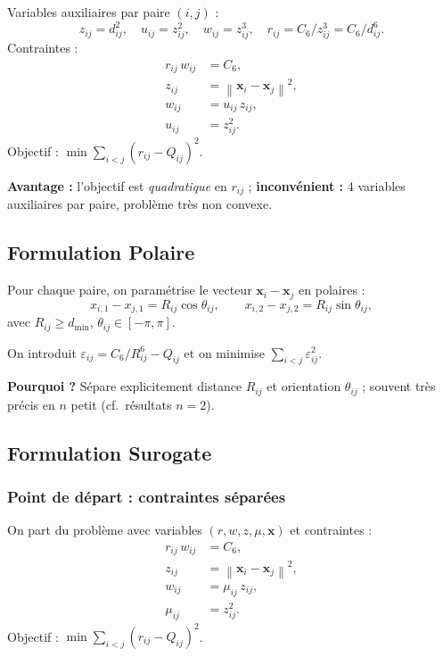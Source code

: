 \documentclass[12pt,a4paper]{article}
\newcommand{\norm}[1]{\left\|#1\right\|}
\begin{document}
Variables auxiliaires par paire $(i,j)$ :
\[
  z_{ij} = d_{ij}^2,\quad
  u_{ij} = z_{ij}^2,\quad
  w_{ij} = z_{ij}^3,\quad
  r_{ij} = C_6/z_{ij}^3 = C_6/d_{ij}^6.
\]
Contraintes :
\begin{align*}
  r_{ij}\,w_{ij} &= C_6, \\
  z_{ij} &= \norm{\mathbf{x}_i-\mathbf{x}_j}^2, \\
  w_{ij} &= u_{ij}\,z_{ij}, \\
  u_{ij} &= z_{ij}^2.
\end{align*}
Objectif : $\min \sum_{i<j}(r_{ij}-Q_{ij})^2$.

\textbf{Avantage :} l'objectif est \emph{quadratique} en $r_{ij}$ ;
\textbf{inconvénient :} 4 variables auxiliaires par paire, problème très non convexe.

\subsection{Formulation Polaire}

Pour chaque paire, on paramétrise le vecteur $\mathbf{x}_i-\mathbf{x}_j$ en polaires :
\[
  x_{i,1}-x_{j,1} = R_{ij}\cos\theta_{ij},\qquad
  x_{i,2}-x_{j,2} = R_{ij}\sin\theta_{ij},
\]
avec $R_{ij} \geq d_{\min}$, $\theta_{ij} \in [-\pi,\pi]$.

On introduit $\varepsilon_{ij} = C_6/R_{ij}^6 - Q_{ij}$ et on minimise
$\sum_{i<j}\varepsilon_{ij}^2$.

\textbf{Pourquoi ?} Sépare explicitement distance $R_{ij}$ et orientation
$\theta_{ij}$ ; souvent très précis en $n$ petit (cf.\ résultats $n=2$).

\subsection{Formulation Surogate}

\subsubsection{Point de départ : contraintes séparées}

On part du problème avec variables $(r,w,z,\mu,\mathbf{x})$ et contraintes :
\begin{align}
  r_{ij}\,w_{ij} &= C_6, \label{c1}\\
  z_{ij} &= \norm{\mathbf{x}_i-\mathbf{x}_j}^2, \label{c2}\\
  w_{ij} &= \mu_{ij}\,z_{ij}, \label{c3}\\
  \mu_{ij} &= z_{ij}^2. \label{c4}
\end{align}
Objectif : $\min\sum_{i<j}(r_{ij}-Q_{ij})^2$.
\end{document}
